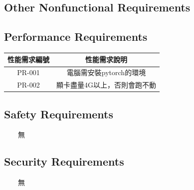 \documentclass{scrreprt}
\begin{document}
\begin{CJK*}{UTF8}{bsmi}
\chapter{Other Nonfunctional Requirements}

\section{Performance Requirements}
\begin{center}
    \begin{tabular}{|c|c|}
        \hline
	    性能需求編號 & 性能需求說明 \\
        \hline
	    PR-001 & 電腦需安裝pytorch的環境\\
        \hline
	    PR-002 & 顯卡盡量4G以上，否則會跑不動\\
        \hline
    \end{tabular}
\end{center}

\section{Safety Requirements} 
　　無
\section{Security Requirements}
　　無

\end{CJK*}
\end{document}
